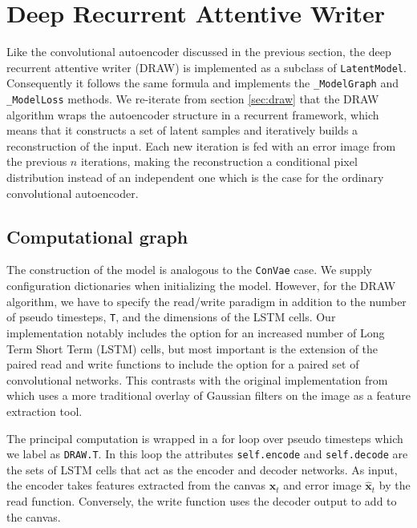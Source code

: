 
\section{Deep Recurrent Attentive Writer}\label{sec:draw_implement}

Like the convolutional autoencoder discussed in the previous section, the deep recurrent attentive writer (DRAW) is implemented as a subclass of \lstinline{LatentModel}. Consequently it follows the same formula and implements the  \lstinline{_ModelGraph} and \lstinline{_ModelLoss} methods. We re-iterate from section \ref{sec:draw} that the  DRAW algorithm wraps the autoencoder structure in a recurrent framework, which means that it constructs a set of latent samples and iteratively builds a reconstruction of the input. Each new iteration is fed with an error image from the previous $n$ iterations, making the reconstruction a conditional pixel distribution instead of an independent one which is the case for the ordinary convolutional autoencoder. 

\subsection{Computational graph}

The construction of the model is analogous to the \lstinline{ConVae} case. We supply configuration dictionaries when initializing the model. However, for the DRAW algorithm, we have to specify the read/write paradigm in addition to the number of pseudo timesteps, \lstinline{T}, and the dimensions of the LSTM cells.  Our implementation notably includes the option for an increased number of  Long Term Short Term (LSTM) cells, but most important is the extension of the paired read and write functions to include the option for a paired set of convolutional networks. This contrasts with the original implementation from \citet{Gregor2015} which uses a more traditional overlay of Gaussian filters on the image as a feature extraction tool. 

The principal computation is wrapped in a for loop over pseudo timesteps which we label as \lstinline{DRAW.T}. In this loop the attributes \lstinline{self.encode} and \lstinline{self.decode} are the sets of LSTM cells that act as the encoder and decoder networks. As input, the encoder takes features extracted from the canvas $\mathbf{x}_t$ and error image $\mathbf{\hat{x}}_t$ by the read function. Conversely, the write function uses the decoder output to add to the canvas. 

